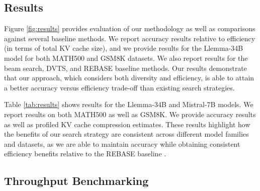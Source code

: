 \subsection {Results}



Figure \ref{fig:results} provides evaluation of our methodology as well as comparisons against several baseline methods.
We report accuracy results relative to efficiency (in terms of total KV cache size), and we provide results for the Llemma-34B model for both MATH500 and GSM8K datasets.
We also report results for the beam search, DVTS, and REBASE baseline methods.
Our results demonstrate that our approach, which considers both diversity and efficiency, is able to attain a better accuracy versus efficiency trade-off than existing search strategies.

Table \ref{tab:results} shows results for the Llemma-34B and Mistral-7B models.
We report results on both MATH500 as well as GSM8K.
We provide accuracy results as well as profiled KV cache compression estimates.
These results highlight how the benefits of our search strategy are consistent across different model families and datasets, as we are able to maintain accuracy while obtaining consistent efficiency benefits relative to the REBASE baseline \cite{wu2024inference}.

\subsection{Throughput Benchmarking}

\begin{table}[t!]
\caption{
Throughput for our approach relative to REBASE \cite{wu2024inference}.
Results were measured on NVIDIA H100 GPUs using the Llemma-34B model, evaluated on 100 samples from the MATH500 test set (with the accuracy reported for the full test set).
We report throughput improvements using a beam width of 256.
We also include the reduction in KV cache size (normalized to REBASE), as well as the accuracy for each approach.
}
\scriptsize
\vspace{2mm}
\label{tab:throughput}
         
\end{table}



